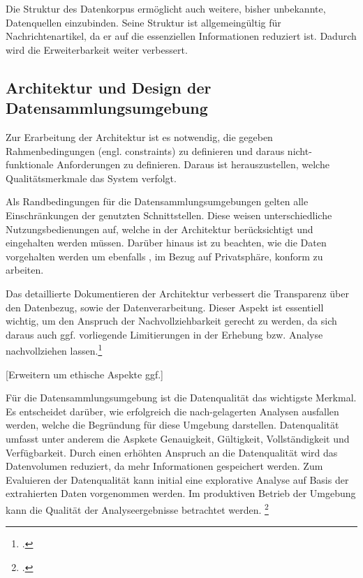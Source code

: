 Die Struktur des Datenkorpus ermöglicht auch weitere, bisher unbekannte, Datenquellen einzubinden. Seine Struktur ist allgemeingültig für Nachrichtenartikel, da er auf die essenziellen Informationen reduziert ist. 
Dadurch wird die Erweiterbarkeit weiter verbessert.

\newpage
\subsection{Architektur und Design der Datensammlungsumgebung}
Zur Erarbeitung der Architektur ist es notwendig, die gegeben Rahmenbedingungen (engl. constraints) zu definieren und daraus nicht- funktionale Anforderungen zu definieren. Daraus ist herauszustellen, welche Qualitätsmerkmale das System verfolgt. 

Als  Randbedingungen für die Datensammlungsumgebungen gelten alle Einschränkungen der genutzten Schnittstellen. Diese weisen unterschiedliche Nutzungsbedienungen auf, welche in der Architektur berücksichtigt und eingehalten werden müssen. Darüber hinaus ist zu beachten, wie die Daten vorgehalten werden um ebenfalls , im Bezug auf Privatsphäre, konform zu arbeiten. 

Das detaillierte Dokumentieren der Architektur verbessert die Transparenz über den Datenbezug, sowie der Datenverarbeitung. Dieser Aspekt ist essentiell wichtig, um den Anspruch der Nachvollziehbarkeit gerecht zu werden, da sich daraus auch ggf. vorliegende Limitierungen in der Erhebung bzw. Analyse nachvollziehen lassen.\footcite[Vgl.][]{Sayogo.Challenges.2015}{}{}

[Erweitern um ethische Aspekte ggf.]

Für die Datensammlungsumgebung ist die Datenqualität das wichtigste Merkmal. Es entscheidet darüber, wie erfolgreich die nach-gelagerten Analysen ausfallen werden, welche die Begründung für diese Umgebung darstellen. Datenqualität umfasst unter anderem die Aspkete Genauigkeit, Gültigkeit, Vollständigkeit und Verfügbarkeit.
Durch einen erhöhten Anspruch an die Datenqualität wird das Datenvolumen reduziert, da mehr Informationen gespeichert werden. Zum Evaluieren der Datenqualität kann initial eine explorative Analyse auf Basis der extrahierten Daten vorgenommen werden. Im produktiven Betrieb der Umgebung kann die Qualität der Analyseergebnisse betrachtet werden. \footcite[Vgl.][]{Kilkenny.Data.2018}

